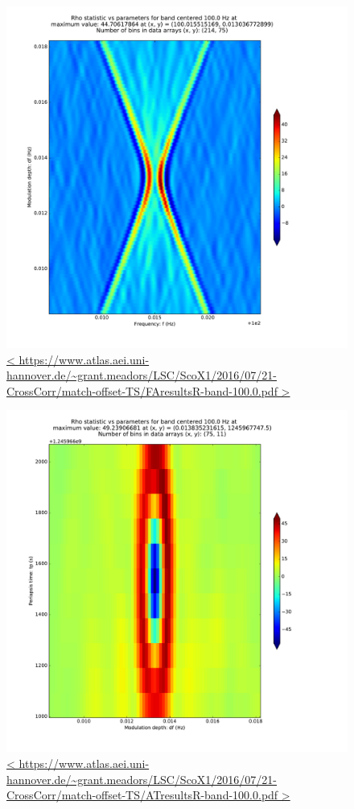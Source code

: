 \documentclass{article}
\begin{document}
\begin{figure}
\includegraphics[trim= 0 0 0 0, clip, width=0.40\paperwidth,keepaspectratio]{plots/match-offset-TS/FAresultsR-band-100-0.pdf}
\caption{
\url{<
https://www.atlas.aei.uni-hannover.de/~grant.meadors/LSC/ScoX1/2016/07/21-CrossCorr/match-offset-TS/FAresultsR-band-100.0.pdf
>}
}
\end{figure}

\begin{figure}
\includegraphics[trim= 0 0 0 0, clip, width=0.40\paperwidth,keepaspectratio]{plots/match-offset-TS/ATresultsR-band-100-0.pdf}
\caption{
\url{<
https://www.atlas.aei.uni-hannover.de/~grant.meadors/LSC/ScoX1/2016/07/21-CrossCorr/match-offset-TS/ATresultsR-band-100.0.pdf
>}
}
\end{figure}
\end{document}
